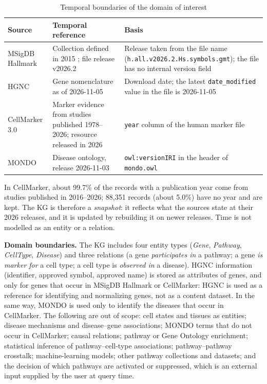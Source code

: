 \begin{table}[htbp]
\centering
\small
\begin{tabularx}{\linewidth}{|l|X|X|}
\hline
\textbf{Source} & \textbf{Temporal reference} & \textbf{Basis} \\ \hline
MSigDB Hallmark & Collection defined in 2015 \cite{liberzon2015molecular}; file release v2026.2 & Release taken from the file name (\texttt{h.all.v2026.2.Hs.symbols.gmt}); the file has no internal version field \\ \hline
HGNC & Gene nomenclature as of 2026-11-05 \cite{seal2026genenames} & Download date; the latest \texttt{date\_modified} value in the file is 2026-11-05 \\ \hline
CellMarker 3.0 & Marker evidence from studies published 1978--2026; resource released in 2026 \cite{hu2026cellmarker} & \texttt{year} column of the human marker file \\ \hline
MONDO & Disease ontology, release 2026-11-03 \cite{vasilevsky2026mondo} & \texttt{owl:versionIRI} in the header of \texttt{mondo.owl} \\ \hline
\end{tabularx}
\caption{Temporal boundaries of the domain of interest}
\label{tab:time-scope}
\end{table}

\noindent In CellMarker, about 99.7\% of the records with a publication year come from studies published in 2016--2026; 88,351 records (about 5.0\%) have no year and are kept. The KG is therefore a \emph{snapshot}: it reflects what the sources state at their 2026 releases, and it is updated by rebuilding it on newer releases. Time is not modelled as an entity or a relation.

\medskip\noindent\textbf{Domain boundaries.} The KG includes four entity types (\emph{Gene}, \emph{Pathway}, \emph{CellType}, \emph{Disease}) and three relations (a gene \emph{participates in} a pathway; a gene \emph{is marker for} a cell type; a cell type is \emph{observed in} a disease). HGNC information (identifier, approved symbol, approved name) is stored as attributes of genes, and only for genes that occur in MSigDB Hallmark or CellMarker: HGNC is used as a reference for identifying and normalizing genes, not as a content dataset. In the same way, MONDO is used only to identify the diseases that occur in CellMarker. The following are out of scope: cell states and tissues as entities; disease mechanisms and disease--gene associations; MONDO terms that do not occur in CellMarker; causal relations; pathway or Gene Ontology enrichment; statistical inference of pathway--cell-type associations; pathway--pathway crosstalk; machine-learning models; other pathway collections and datasets; and the decision of which pathways are activated or suppressed, which is an external input supplied by the user at query time.

